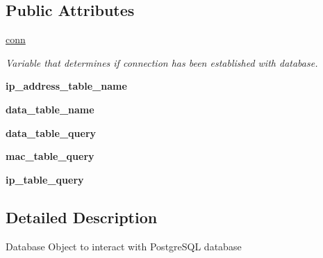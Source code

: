 \subsection*{Public Attributes}
\begin{DoxyCompactItemize}
\item 
\mbox{\label{classDatabaseConnect_1_1DatabaseConnect_a78638fb6d8d62d65640ebedf85991b6a}} 
\mbox{\hyperlink{classDatabaseConnect_1_1DatabaseConnect_a78638fb6d8d62d65640ebedf85991b6a}{conn}}
\begin{DoxyCompactList}\small\item\em Variable that determines if connection has been established with database. \end{DoxyCompactList}\item 
\mbox{\label{classDatabaseConnect_1_1DatabaseConnect_ae78cbb6e9829dc9a63f5d722e8025aee}} 
{\bfseries ip\+\_\+address\+\_\+table\+\_\+name}
\item 
\mbox{\label{classDatabaseConnect_1_1DatabaseConnect_a6569648076b2d18f3ad3680f6854d06f}} 
{\bfseries data\+\_\+table\+\_\+name}
\item 
\mbox{\label{classDatabaseConnect_1_1DatabaseConnect_a70d03164f9b01fcdbc35480d46b21d36}} 
{\bfseries data\+\_\+table\+\_\+query}
\item 
\mbox{\label{classDatabaseConnect_1_1DatabaseConnect_ae0bdac80a880408ef9ae0c1893f0ff47}} 
{\bfseries mac\+\_\+table\+\_\+query}
\item 
\mbox{\label{classDatabaseConnect_1_1DatabaseConnect_ab17dd9dd7edc7ca73a0dc4d41443e8d2}} 
{\bfseries ip\+\_\+table\+\_\+query}
\end{DoxyCompactItemize}


\subsection{Detailed Description}
\begin{DoxyVerb}Database Object to interact with PostgreSQL database\end{DoxyVerb}
 


